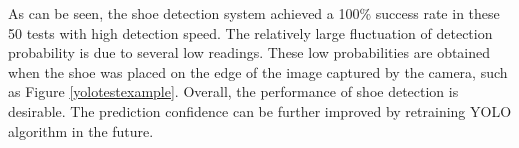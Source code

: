 \begin{table}[H]
\centering
{}
\caption{The testing results of YOLO shoe detection}
\label{yolotest}
\end{table}

As can be seen, the shoe detection system achieved a 100\% success rate in these 50 tests with high detection speed. The relatively large fluctuation of detection probability is due to several low readings. These low probabilities are obtained when the shoe was placed on the edge of the image captured by the camera, such as Figure \ref{yolotestexample}. Overall, the performance of shoe detection is desirable. The prediction confidence can be further improved by retraining YOLO algorithm in the future.

